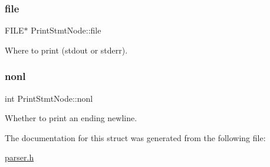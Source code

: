 \subsubsection{\texorpdfstring{file}{file}}
{\footnotesize\ttfamily F\+I\+LE$\ast$ Print\+Stmt\+Node\+::file}

Where to print ({\ttfamily stdout} or {\ttfamily stderr}). \mbox{\label{struct_print_stmt_node_a147ba34eeda7bcfb39f2846a678d091c}} 
\subsubsection{\texorpdfstring{nonl}{nonl}}
{\footnotesize\ttfamily int Print\+Stmt\+Node\+::nonl}

Whether to print an ending newline. 

The documentation for this struct was generated from the following file\+:\begin{DoxyCompactItemize}
\item 
\hyperlink{parser_8h}{parser.\+h}\end{DoxyCompactItemize}
